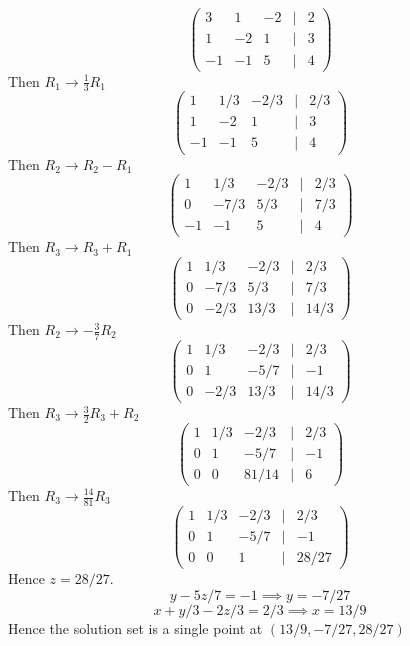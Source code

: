 \documentclass{article}
\begin{document}
\subsection{}
\[\begin{pmatrix}
    3&1&-2&|&2 \\ 1&-2&1&|&3 \\ -1&-1&5&|&4
\end{pmatrix}\]
Then \(R_1 \rightarrow \frac{1}{3}R_1\)
\[\begin{pmatrix}
    1&1/3&-2/3&|&2/3 \\ 1&-2&1&|&3 \\ -1&-1&5&|&4
\end{pmatrix}\]
Then \(R_2 \rightarrow R_2-R_1\)
\[\begin{pmatrix}
    1&1/3&-2/3&|&2/3 \\ 0&-7/3&5/3&|&7/3 \\ -1&-1&5&|&4
\end{pmatrix}\]
Then \(R_3 \rightarrow R_3 + R_1\)
\[\begin{pmatrix}
    1&1/3&-2/3&|&2/3 \\ 0&-7/3&5/3&|&7/3 \\ 0&-2/3&13/3&|&14/3
\end{pmatrix}\]
Then \(R_2 \rightarrow -\frac{3}{7}R_2\)
\[\begin{pmatrix}
    1&1/3&-2/3&|&2/3 \\ 0&1&-5/7&|&-1 \\ 0&-2/3&13/3&|&14/3
\end{pmatrix}\]
Then \(R_3 \rightarrow \frac{3}{2}R_3 + R_2\)
\[\begin{pmatrix}
    1&1/3&-2/3&|&2/3 \\ 0&1&-5/7&|&-1 \\ 0&0&81/14&|&6
\end{pmatrix}\]
Then \(R_3 \rightarrow \frac{14}{81}R_3\)
\[\begin{pmatrix}
    1&1/3&-2/3&|&2/3 \\ 0&1&-5/7&|&-1 \\ 0&0&1&|&28/27
\end{pmatrix}\]
Hence \(z = 28/27\). 
\[y-5z/7 = -1 \implies y = -7/27\]
\[x+y/3-2z/3 = 2/3 \implies x = 13/9\]
Hence the solution set is a single point at \((13/9, -7/27, 28/27)\)
\end{document}
